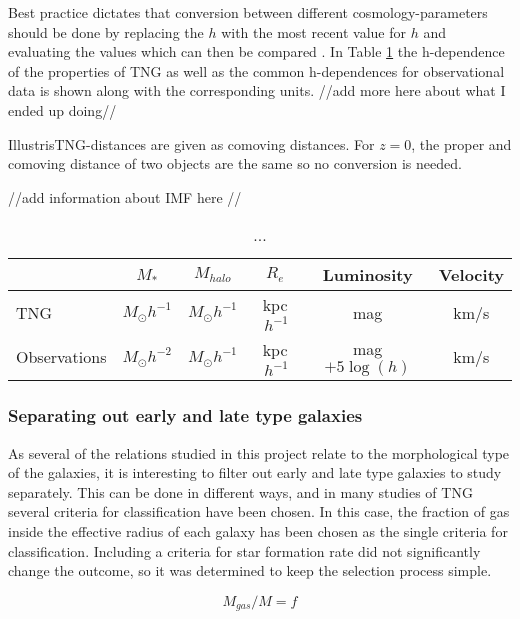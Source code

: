 Best practice dictates that conversion between different cosmology-parameters should be done by replacing the $h$ with the most recent value for $h$ and evaluating the values which can then be compared \parencite{Croton2013}. In Table \ref{h_dependence} the h-dependence of the properties of TNG as well as the common h-dependences for observational data is shown along with the corresponding units. //add more here about what I ended up doing//

IllustrisTNG-distances are given as comoving distances. For $z=0$, the proper and comoving distance of two objects are the same so no conversion is needed.

//add information about IMF here //


\begin{table}
\begin{center}
\begin{tabular}{ l| c c c c c } 
 \hline
 \hline
   & $M_*$ & $M_{halo}$ & $R_e$ & Luminosity & Velocity \\
 \hline
 TNG & $M_{\odot}h^{-1}$ & $M_{\odot}h^{-1}$ & kpc$\,h^{-1}$ & mag & km/s \\ 
 Observations & $M_{\odot}h^{-2}$ & $M_{\odot}h^{-1}$ & kpc$\,h^{-1}$ & mag $+5\log(h)$ & km/s \\
 \hline 
 \end{tabular}
\end{center}
\caption{...}
 \label{h_dependence}
\end{table}

\subsubsection{Separating out early and late type galaxies}
As several of the relations studied in this project relate to the morphological type of the galaxies, it is interesting to filter out early and late type galaxies to study separately. This can be done in different ways, and in many studies of TNG several criteria for classification have been chosen. In this case, the fraction of gas inside the effective radius of each galaxy has been chosen as the single criteria for classification. Including a criteria for star formation rate did not significantly change the outcome, so it was determined to keep the selection process simple.

\begin{equation}
    M_{gas}/M  = f
\end{equation}

